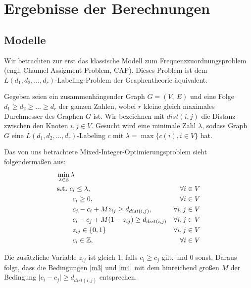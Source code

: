 \documentclass[
	fontsize=12pt,
	paper=a4,
	twoside=false,
	numbers=noenddot,
	plainheadsepline,
	toc=listof,
	toc=bibliography
]{scrartcl}
\begin{document}
\section*{Ergebnisse der Berechnungen}

\subsection*{Modelle}

Wir betrachten zur erst das klassische Modell zum Frequenzzuordnungsproblem (engl. Channel Assigment Problem, CAP). Dieses Problem ist dem $L(d_1, d_2, \dots, d_r)$-Labeling-Problem der Graphentheorie äquivalent.

Gegeben seien ein zusammenhängender Graph $G=(V,\ E)$ und eine Folge $d_1\ge d_2\ge\dots\ge d_r$ der ganzen Zahlen, wobei $r$ kleine gleich maximales Durchmesser des Graphen $G$ ist. Wir bezeichnen mit $dist(i,j)$ die Distanz zwischen den Knoten $i,j\in V$. Gesucht wird eine minimale Zahl $\lambda$, sodass Graph $G$ eine $L(d_1, d_2, \dots, d_r)$-Labeling $c$ mit $\lambda = \max\{c(i), i\in V\}$ hat.




Das von uns betrachtete Mixed-Integer-Optimierungsproblem sieht folgendermaßen aus: 
\begin{align}\label{model}
& \min_{\lambda\in\mathbb{Z}}\lambda & \\
\label{m1} & \text{\bf s.t.}\ c_{i}\le\lambda,& \forall i\in V \\
\label{m2} & \hspace{23 pt} c_{i}\ge 0, & \forall i\in V \\
\label{m3} & \hspace{23 pt} c_j-c_i + M z_{ij}\ge d_{dist(i,j)}, & \forall i,j\in V\\
\label{m4} & \hspace{23 pt} c_i-c_j + M(1-z_{ij})\ge d_{dist(i,j)}& \forall i,j\in V\\
\label{m5} & \hspace{23 pt} z_{ij}\in \{0,1\}& \forall i,j\in V \\ 
\label{m6} & \hspace{23 pt} c_{i}\in \mathbb{Z},& \forall i\in V
\end{align}

Die zusätzliche Variable $z_{ij}$ ist gleich $1$, falls $c_{i}\ge c_{j}$ gilt, und $0$ sonst. Daraus folgt, dass die Bedingungen \ref{m3} und \ref{m4} mit dem hinreichend großen $M$ der Bedingung $\lvert c_i-c_j\rvert\ge d_{dist(i,j)}$ entsprechen.
\end{document}
